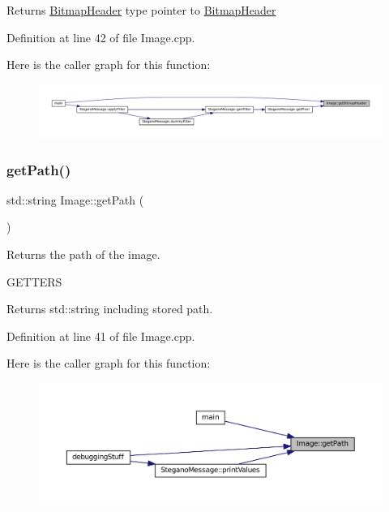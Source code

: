 \begin{DoxyReturn}{Returns}
\mbox{\hyperlink{classBitmapHeader}{Bitmap\+Header}} type pointer to \mbox{\hyperlink{classBitmapHeader}{Bitmap\+Header}} 
\end{DoxyReturn}


Definition at line 42 of file Image.\+cpp.

Here is the caller graph for this function\+:\nopagebreak
\begin{figure}[H]
\begin{center}
\leavevmode
\includegraphics[width=350pt]{classImage_a8c824ffac0c866a94752a2c1047932af_icgraph}
\end{center}
\end{figure}
\mbox{\label{classImage_a885989eb723cb0a1fc0555c7e8de817e}} 
\subsubsection{\texorpdfstring{getPath()}{getPath()}}
{\footnotesize\ttfamily std\+::string Image\+::get\+Path (\begin{DoxyParamCaption}{ }\end{DoxyParamCaption})}



Returns the path of the image. 

G\+E\+T\+T\+E\+RS\begin{DoxyReturn}{Returns}
std\+::string including stored path. 
\end{DoxyReturn}


Definition at line 41 of file Image.\+cpp.

Here is the caller graph for this function\+:\nopagebreak
\begin{figure}[H]
\begin{center}
\leavevmode
\includegraphics[width=350pt]{classImage_a885989eb723cb0a1fc0555c7e8de817e_icgraph}
\end{center}
\end{figure}
\mbox{\label{classImage_ac4e8db14cfd60a6a7085e6fcb83488a4}} 
